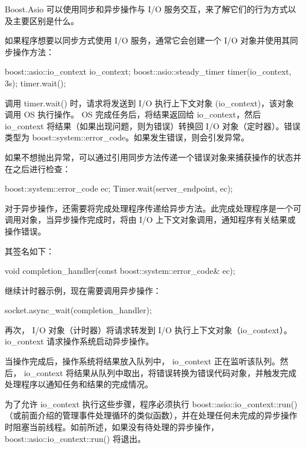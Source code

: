 

Boost.Asio 可以使用同步和异步操作与 I/O 服务交互，来了解它们的行为方式以及主要区别是什么。


如果程序想要以同步方式使用 I/O 服务，通常它会创建一个 I/O 对象并使用其同步操作方法：

\begin{cpp}
boost::asio::io_context io_context;
boost::asio::steady_timer timer(io_context, 3s);
timer.wait();
\end{cpp}

调用 timer.wait() 时，请求将发送到 I/O 执行上下文对象 (io\_context)，该对象调用 OS 执行操作。 OS 完成任务后，将结果返回给 io\_context，然后 io\_context 将结果（如果出现问题，则为错误）转换回 I/O 对象（定时器）。错误类型为 boost::system::error\_code。如果发生错误，则会引发异常。

如果不想抛出异常，可以通过引用同步方法传递一个错误对象来捕获操作的状态并在之后进行检查：

\begin{cpp}
boost::system::error_code ec;
Timer.wait(server_endpoint, ec);
\end{cpp}


对于异步操作，还需要将完成处理程序传递给异步方法。此完成处理程序是一个可调用对象，当异步操作完成时，将由 I/O 上下文对象调用，通知程序有关结果或操作错误。

其签名如下：

\begin{cpp}
void completion_handler(const boost::system::error_code& ec);
\end{cpp}

继续计时器示例，现在需要调用异步操作：

\begin{cpp}
socket.async_wait(completion_handler);
\end{cpp}

再次， I/O 对象（计时器）将请求转发到 I/O 执行上下文对象（io\_context）。 io\_context 请求操作系统启动异步操作。

当操作完成后，操作系统将结果放入队列中， io\_context 正在监听该队列。然后， io\_context 将结果从队列中取出，将错误转换为错误代码对象，并触发完成处理程序以通知任务和结果的完成情况。

为了允许 io\_context 执行这些步骤，程序必须执行 boost::asio::io\_context::run()（或前面介绍的管理事件处理循环的类似函数），并在处理任何未完成的异步操作时阻塞当前线程。如前所述，如果没有待处理的异步操作， boost::asio::io\_context::run() 将退出。

